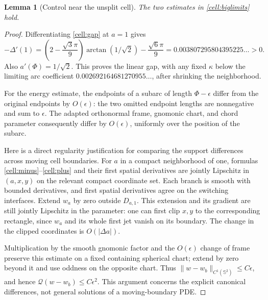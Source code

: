 \documentclass[11pt]{article}
\newtheorem{lemma}[theorem]{Lemma}
\theoremstyle{remark}\newtheorem{remark}[theorem]{Remark}
\newcommand{\Sph}{\mathbb S^2}
\newcommand{\Q}{\mathcal Q}
\begin{document}
\begin{lemma}[Control near the unsplit cell]\label{cell:nearsquare}
The two estimates in \eqref{cell:biglimits} hold.
\end{lemma}
\begin{proof}
Differentiating \eqref{cell:gap} at $a=1$ gives
\[
 -\Delta'(1)=
 \left(2-\frac{\sqrt3\pi}{9}\right)\arctan(1/\sqrt2)
 -\frac{\sqrt6\pi}{9}
 =0.003807295804395225\ldots>0.
\]
Also $a'(\Phi)=1/\sqrt2$. This proves the linear gap, with any fixed $\kappa$ below the limiting arc coefficient
$0.002692164681270955\ldots$, after shrinking the neighborhood.

For the energy estimate, the endpoints of a subarc of length $\Phi-\epsilon$ differ from the original endpoints by $O(\epsilon)$: the two omitted endpoint lengths are nonnegative and sum to $\epsilon$. The adapted orthonormal frame, gnomonic chart, and chord parameter consequently differ by $O(\epsilon)$, uniformly over the position of the subarc.

Here is a direct regularity justification for comparing the support differences across moving cell boundaries. For $a$ in a compact neighborhood of one, formulas \eqref{cell:minus}--\eqref{cell:plus} and their first spatial derivatives are jointly Lipschitz in $(a,x,y)$ on the relevant compact coordinate set. Each branch is smooth with bounded derivatives, and first spatial derivatives agree on the switching interfaces. Extend $w_a$ by zero outside $D_{a,1}$. This extension and its gradient are still jointly Lipschitz in the parameter: one can first clip $x,y$ to the corresponding rectangle, since $w_a$ and its whole first jet vanish on its boundary. The change in the clipped coordinates is $O(|\Delta a|)$.

Multiplication by the smooth gnomonic factor and the $O(\epsilon)$ change of frame preserve this estimate on a fixed containing spherical chart; extend by zero beyond it and use oddness on the opposite chart. Thus
$\|w-w_b\|_{C^1(\Sph)}\leq C\epsilon$, and hence $\Q(w-w_b)\leq C\epsilon^2$. This argument concerns the explicit canonical differences, not general solutions of a moving-boundary PDE.
\end{proof}
\end{document}
